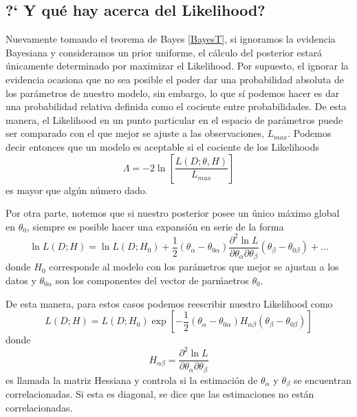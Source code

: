 \documentclass[onecolumn,           %
               showpacs,            %
               preprintnumbers,     %
               aps,                 %
               prl,          	    %
               letterpaper,             %
               superscriptaddress,      %
               nofootinbib,         %
               tightenlines,        %
               floats,floatfix      %
               ,usenatbib,
               ]{revtex4-1}
\begin{document}
\subsection{?` Y qu\'e hay acerca del Likelihood?}

Nuevamente tomando el teorema de Bayes \eqref{BayesT}, si ignoramos la evidencia Bayesiana y consideramos un prior uniforme, el c\'alculo del posterior estar\'a \'unicamente determinado por maximizar el Likelihood. Por supuesto, el ignorar la evidencia ocasiona que no sea posible el poder dar una probabilidad absoluta de los par\'ametros de nuestro modelo, sin embargo, lo que s\'i podemos hacer es dar una probabilidad relativa definida como el cociente entre probabilidades. De esta manera, el Likelihood en un punto particular en el espacio de par\'ametros puede ser comparado con el que mejor se ajuste a las observaciones, $L_{max}$. Podemos decir entonces que un modelo es aceptable si el cociente de los Likelihoods
\begin{equation}
\Lambda=-2\ln\left[\frac{L(D;\theta,H)}{L_{max}}\right]
\end{equation}
es mayor que alg\'un n\'umero dado.

Por otra parte, notemos que si nuestro posterior posee un \'unico m\'aximo global en $\theta_0$, siempre es posible hacer una expansi\'on en serie de la forma
\begin{equation}
\ln L(D;H)=\ln L(D;H_0)+\frac{1}{2}(\theta_\alpha-\theta_{0\alpha})\frac{\partial^2\ln L}{\partial\theta_\alpha \partial\theta_\beta}(\theta_\beta-\theta_{0\beta})+...
\end{equation}
donde $H_0$ corresponde al modelo con los par\'ametros que mejor se ajustan a los datos y $\theta_{0\alpha}$ son los componentes del vector de par\'maetros $\theta_0$.

De esta manera, para estos casos podemos reescribir nuestro Likelihood como
\begin{equation}\label{GLik}
L(D;H)=L(D;H_0)\exp \left[-\frac{1}{2}(\theta_\alpha-\theta_{0\alpha})H_{\alpha\beta}(\theta_\beta-\theta_{0\beta})\right]
\end{equation}
donde
\begin{equation}
H_{\alpha\beta}=\frac{\partial^2\ln L}{\partial\theta_\alpha \partial\theta_\beta}
\end{equation}
es llamada la matriz Hessiana y controla si la estimaci\'on de $\theta_\alpha$ y $\theta_\beta$ se encuentran correlacionadas. Si esta es diagonal, se dice que las estimaciones no est\'an correlacionadas.
\end{document}
